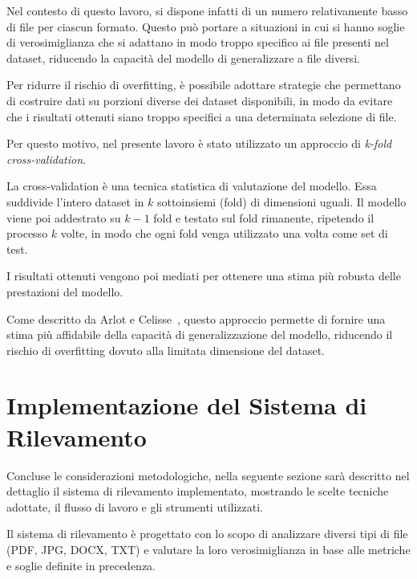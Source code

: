\documentclass{report}
\begin{document}
Nel contesto di questo lavoro, si dispone infatti di un numero relativamente basso di file per ciascun formato.
Questo può portare a situazioni in cui si hanno soglie di verosimiglianza che si adattano in modo troppo specifico ai file presenti nel dataset,
riducendo la capacità del modello di generalizzare a file diversi.

\bigskip

Per ridurre il rischio di overfitting, è possibile adottare strategie che permettano di costruire dati su porzioni diverse dei dataset
disponibili, in modo da evitare che i risultati ottenuti siano troppo specifici a una determinata selezione di file.

\bigskip

Per questo motivo, nel presente lavoro è stato utilizzato un approccio di \emph{k-fold cross-validation}.

\bigskip

La cross-validation è una tecnica statistica di valutazione del modello. Essa suddivide l'intero dataset
in \(k\) sottoinsiemi (fold) di dimensioni uguali. Il modello viene poi addestrato su \(k-1\) fold e testato sul fold rimanente, 
ripetendo il processo \(k\) volte, in modo che ogni fold venga utilizzato una volta come set di test.

I risultati ottenuti vengono poi mediati per ottenere una stima più robusta delle prestazioni del modello.

Come descritto da Arlot e Celisse~\cite{arlot2010crossvalidation}, questo approccio permette di fornire una stima più affidabile della capacità di generalizzazione del modello,
riducendo il rischio di overfitting dovuto alla limitata dimensione del dataset.




\section{Implementazione del Sistema di Rilevamento}

Concluse le considerazioni metodologiche, nella seguente sezione sarà descritto nel dettaglio il sistema di rilevamento implementato,
mostrando le scelte tecniche adottate, il flusso di lavoro e gli strumenti utilizzati.

\bigskip

Il sistema di rilevamento è progettato con lo scopo di analizzare diversi tipi di file (PDF, JPG, DOCX, TXT) 
e valutare la loro verosimiglianza in base alle metriche e soglie definite in precedenza.
\end{document}
